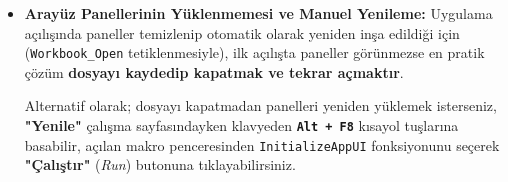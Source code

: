 \vspace{0.3cm}

\begin{itemize}
    \item \textbf{Arayüz Panellerinin Yüklenmemesi ve Manuel Yenileme:} Uygulama açılışında paneller temizlenip otomatik olarak yeniden inşa edildiği için (\texttt{Workbook\_Open} tetiklenmesiyle), ilk açılışta paneller görünmezse en pratik çözüm \textbf{dosyayı kaydedip kapatmak ve tekrar açmaktır}.
    
    Alternatif olarak; dosyayı kapatmadan panelleri yeniden yüklemek isterseniz, \textbf{"Yenile"} çalışma sayfasındayken klavyeden \textbf{\texttt{Alt + F8}} kısayol tuşlarına basabilir, açılan makro penceresinden \texttt{InitializeAppUI} fonksiyonunu seçerek \textbf{"Çalıştır"} (\textit{Run}) butonuna tıklayabilirsiniz.
\end{itemize}